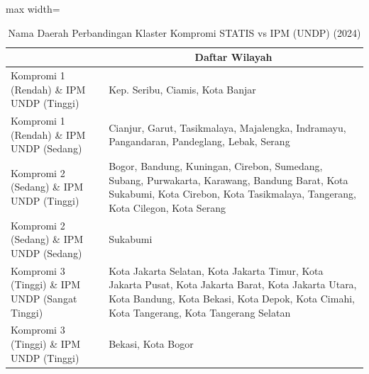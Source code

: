 \begin{table}[H]
\centering
\caption{Nama Daerah Perbandingan Klaster Kompromi STATIS vs IPM (UNDP) (2024)} \label{tab:app1comp_ipm_name_2024}
\begin{adjustbox}{max width=\textwidth}
\begin{tabular}{|>{\centering\arraybackslash}p{4cm}|p{10cm}|}
\hline
\multicolumn{1}{|c|}{\textbf{Kategori}} & \multicolumn{1}{c|}{\textbf{Daftar Wilayah}} \\
\hline
Kompromi 1 (Rendah) \& IPM UNDP (Tinggi) & Kep. Seribu, Ciamis, Kota Banjar \\
\hline
Kompromi 1 (Rendah) \& IPM UNDP (Sedang) & Cianjur, Garut, Tasikmalaya, Majalengka, Indramayu, Pangandaran, Pandeglang, Lebak, Serang \\
\hline
Kompromi 2 (Sedang) \& IPM UNDP (Tinggi) & Bogor, Bandung, Kuningan, Cirebon, Sumedang, Subang, Purwakarta, Karawang, Bandung Barat, Kota Sukabumi, Kota Cirebon, Kota Tasikmalaya, Tangerang, Kota Cilegon, Kota Serang \\
\hline
Kompromi 2 (Sedang) \& IPM UNDP (Sedang) & Sukabumi \\
\hline
Kompromi 3 (Tinggi) \& IPM UNDP (Sangat Tinggi) & Kota Jakarta Selatan, Kota Jakarta Timur, Kota Jakarta Pusat, Kota Jakarta Barat, Kota Jakarta Utara, Kota Bandung, Kota Bekasi, Kota Depok, Kota Cimahi, Kota Tangerang, Kota Tangerang Selatan \\
\hline
Kompromi 3 (Tinggi) \& IPM UNDP (Tinggi) & Bekasi, Kota Bogor \\
\hline
\end{tabular}
\end{adjustbox}
\end{table}
